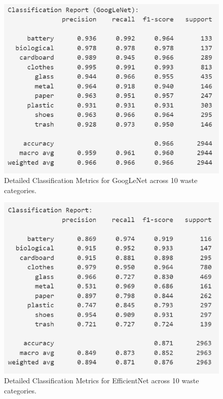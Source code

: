 \documentclass[11pt,twocolumn]{article}
\begin{document}
\begin{figure}[h]
    \centering
    \includegraphics[width=\linewidth]{report_images/gnet_metrics.png}
    \caption{Detailed Classification Metrics for GoogLeNet across 10 waste categories.}
    \label{fig:gnet_metrics}
\end{figure}

\begin{figure}[h]
    \centering
    \includegraphics[width=\linewidth]{report_images/enet_metrics.png}
    \caption{Detailed Classification Metrics for EfficientNet across 10 waste categories.}
    \label{fig:gnet_metrics}
\end{figure}
\end{document}
